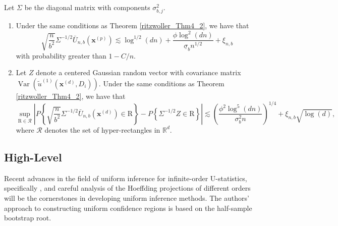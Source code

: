 \documentclass[letterpaper,10pt]{article}
\numberwithin{equation}{section}
\numberwithin{theorem}{section}
\numberwithin{remark}{section}
\numberwithin{example}{section}
\theoremstyle{definition}
\newcommand{\1}{\mathbb{1}}
\begin{document}
\vspace{0.5cm}
\begin{theorem}
	Let $\Sigma$ be the diagonal matrix with components $\sigma_{b, j}^2$.
	\begin{enumerate}
		\item Under the same conditions as Theorem \ref{ritzwoller_Thm4_2}, we have that
		      \begin{equation}
			      \sqrt{\frac{n}{b^2}} \Sigma^{-1 / 2} \bar{U}_{n, b}\left(\mathbf{x}^{(p)}\right) \lesssim \log ^{1 / 2}(d n)+\frac{\phi \log ^2(d n)}{\underline{\sigma}_b n^{1 / 2}}+\xi_{n, b}
		      \end{equation}
		      with probability greater than $1-C / n$.
		\item Let $Z$ denote a centered Gaussian random vector with covariance matrix $\operatorname{Var}\left(\tilde{u}^{(1)}\left(\boldsymbol{x}^{(d)}, D_i\right)\right)$.
		      Under the same conditions as Theorem \ref{ritzwoller_Thm4_2}, we have that
		      \begin{equation}
			      \sup _{\mathrm{R} \in \mathcal{R}}\left|P\left\{\sqrt{\frac{n}{b^2}} \Sigma^{-1 / 2} \bar{U}_{n, b}\left(\boldsymbol{x}^{(d)}\right) \in \mathrm{R}\right\}-P\left\{\Sigma^{-1 / 2} Z \in \mathrm{R}\right\}\right|
			      \lesssim\left(\frac{\phi^2 \log ^5(d n)}{\sigma_b^2 n}\right)^{1 / 4}+\xi_{n, b} \sqrt{\log (d)},
		      \end{equation}
		      where $\mathcal{R}$ denotes the set of hyper-rectangles in $\mathbb{R}^d$.
	\end{enumerate}
\end{theorem}

\subsection{High-Level}
Recent advances in the field of uniform inference for infinite-order U-statistics, specifically \citet{ritzwoller_uniform_2024}, and careful analysis of the Hoeffding projections of different orders will be the cornerstones in developing uniform inference methods.
The authors' approach to constructing uniform confidence regions is based on the half-sample bootstrap root.
\end{document}
